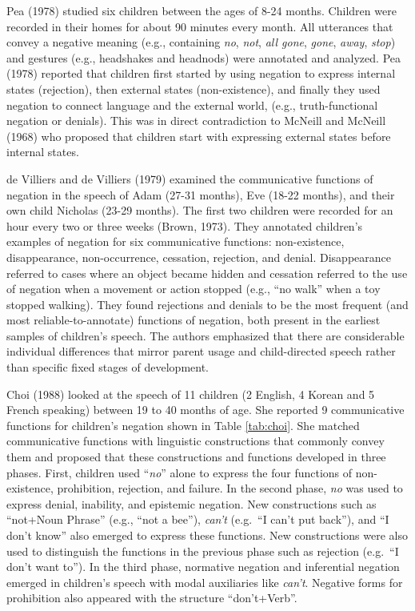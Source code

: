 \documentclass[
  man,floatsintext]{apa6}
\begin{document}
Pea (1978) studied six children between the ages of 8-24 months. Children were recorded in their homes for about 90 minutes every month. All utterances that convey a negative meaning (e.g., containing \emph{no}, \emph{not}, \emph{all gone}, \emph{gone}, \emph{away}, \emph{stop}) and gestures (e.g., headshakes and headnods) were annotated and analyzed. Pea (1978) reported that children first started by using negation to express internal states (rejection), then external states (non-existence), and finally they used negation to connect language and the external world, (e.g., truth-functional negation or denials). This was in direct contradiction to McNeill and McNeill (1968) who proposed that children start with expressing external states before internal states.

de Villiers and de Villiers (1979) examined the communicative functions of negation in the speech of Adam (27-31 months), Eve (18-22 months), and their own child Nicholas (23-29 months). The first two children were recorded for an hour every two or three weeks (Brown, 1973). They annotated children's examples of negation for six communicative functions: non-existence, disappearance, non-occurrence, cessation, rejection, and denial. Disappearance referred to cases where an object became hidden and cessation referred to the use of negation when a movement or action stopped (e.g., ``no walk'' when a toy stopped walking). They found rejections and denials to be the most frequent (and most reliable-to-annotate) functions of negation, both present in the earliest samples of children's speech. The authors emphasized that there are considerable individual differences that mirror parent usage and child-directed speech rather than specific fixed stages of development.

Choi (1988) looked at the speech of 11 children (2 English, 4 Korean and 5 French speaking) between 19 to 40 months of age. She reported 9 communicative functions for children's negation shown in Table \ref{tab:choi}. She matched communicative functions with linguistic constructions that commonly convey them and proposed that these constructions and functions developed in three phases. First, children used ``\emph{no}'' alone to express the four functions of non-existence, prohibition, rejection, and failure. In the second phase, \emph{no} was used to express denial, inability, and epistemic negation. New constructions such as ``not+Noun Phrase'' (e.g., ``not a bee''), \emph{can't} (e.g.~``I can't put back''), and ``I don't know'' also emerged to express these functions. New constructions were also used to distinguish the functions in the previous phase such as rejection (e.g.~``I don't want to''). In the third phase, normative negation and inferential negation emerged in children's speech with modal auxiliaries like \emph{can't}. Negative forms for prohibition also appeared with the structure ``don't+Verb''.
\end{document}
